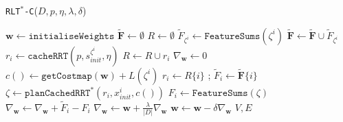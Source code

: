 \documentclass{article}  %
\begin{document}
	\begin{algorithm}
  	\scriptsize
	\caption{\texttt{RLT$^*$-C}($D,p,\eta,\lambda,\delta$)\label{alg:ammp}}
	\begin{algorithmic}[1]
	\STATE $\mathbf{w} \gets \texttt{initialiseWeights}$
	\STATE $\mathbf{\tilde{F}} \gets \emptyset$
	\STATE $R \gets \emptyset$
	\STATE $\tilde{F}_{\zeta^i} \gets \texttt{FeatureSums}(\zeta^i)$
	\STATE $\mathbf{\tilde{F}} \gets \mathbf{\tilde{F}} \cup \tilde{F}_{\zeta^i}$
	\STATE $r_i \gets \texttt{cacheRRT}(p,s_{init}^{\zeta^i},\eta)$
	\STATE $R \gets R \cup r_i $
	\ENDFOR
	\REPEAT
	\STATE $\nabla_{\mathbf{w}}\gets 0$
	\STATE $c() \gets \texttt{getCostmap}(\mathbf{w}) + L(\zeta^i)$ 
	\STATE $r_i \gets R\{i\}$ ;	$\tilde{F}_i \gets \mathbf{\tilde{F}}\{i\}$ 
	\STATE $\zeta \gets \texttt{planCachedRRT}^*(r_i,x^i_{init},c())$
	\STATE $F_i \gets \texttt{FeatureSums}(\zeta)$
	\STATE $\nabla_{\mathbf{w}} \gets \nabla_{\mathbf{w}} + \tilde{F}_i - F_i $
	\ENDFOR
	\STATE $\nabla_{\mathbf{w}} \gets \mathbf{w} + \frac{\lambda}{|D|}\nabla_{\mathbf{w}} $
	\STATE $\mathbf{w} \gets \mathbf{w} - \delta\nabla_{\mathbf{w}} $
	\RETURN $V,E$

	\end{algorithmic}
	\end{algorithm}


\end{document}
